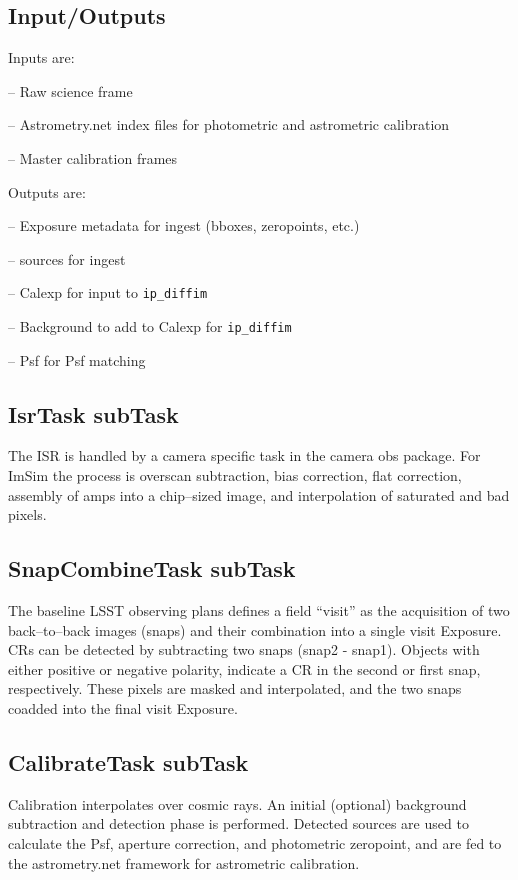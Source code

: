 \documentclass[prd, nofootinbib, floatfix, 11pt,tightenlines,times]{article}
\begin{document}
\subsection{Input/Outputs}
Inputs are:

-- Raw science frame

-- Astrometry.net index files for photometric and astrometric calibration

-- Master calibration frames


Outputs are:

-- Exposure metadata for ingest (bboxes, zeropoints, etc.)

-- sources for ingest

-- Calexp for input to {\tt ip\_diffim}

-- Background to add to Calexp for {\tt ip\_diffim}

-- Psf for Psf matching

\subsection{IsrTask subTask}
The ISR is handled by a camera specific task in the camera obs
package.  For ImSim the process is overscan subtraction, bias
correction, flat correction, assembly of amps into a chip--sized
image, and interpolation of saturated and bad pixels.

\subsection{SnapCombineTask subTask}
The baseline LSST observing plans defines a field ``visit'' as the
acquisition of two back--to--back images (snaps) and their combination
into a single visit Exposure.  CRs can be detected by subtracting two
snaps (snap2 - snap1). Objects with either positive or negative
polarity, indicate a CR in the second or first snap, respectively.
These pixels are masked and interpolated, and the two snaps coadded
into the final visit Exposure.


\subsection{CalibrateTask subTask} 
Calibration interpolates over cosmic rays.  An initial (optional)
background subtraction and detection phase is performed.  Detected
sources are used to calculate the Psf, aperture correction, and
photometric zeropoint, and are fed to the astrometry.net framework for
astrometric calibration.
\end{document}
